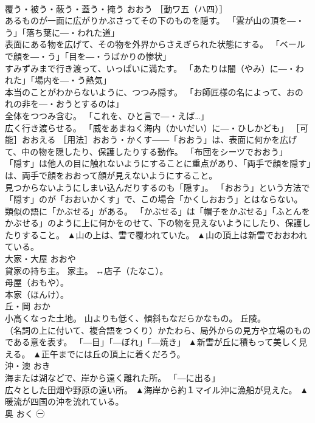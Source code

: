 \documentclass[8pt]{extreport}
\begin{document}
\begin{CJK}{UTF8}{min}
\\	覆う・被う・蔽う・蓋う・掩う	おおう	［動ワ五（ハ四）］ 
\\	あるものが一面に広がりかぶさってその下のものを隠す。 「雲が山の頂を―・う」「落ち葉に―・われた道」 
\\	表面にある物を広げて、その物を外界からさえぎられた状態にする。 「ベールで顔を―・う」「目を―・うばかりの惨状」 
\\	すみずみまで行き渡って、いっぱいに満たす。 「あたりは闇（やみ）に―・われた」「場内を―・う熱気」 
\\	本当のことがわからないように、つつみ隠す。 「お師匠様の名によって、おのれの非を―・おうとするのは」 
\\	全体をつつみ含む。 「これを、ひと言で―・えば…」 
\\	広く行き渡らせる。 「威をあまねく海内（かいだい）に―・ひしかども」 ［可能］おおえる ［用法］おおう・かくす――「おおう」は、表面に何かを広げて、中の物を隠したり、保護したりする動作。 「布団をシーツでおおう」
\\	「隠す」は他人の目に触れないようにすることに重点があり、「両手で顔を隠す」は、両手で顔をおおって顔が見えないようにすること。 
\\	見つからないようにしまい込んだりするのも「隠す」。 「おおう」という方法で「隠す」のが「おおいかくす」で、この場合「かくしおおう」とはならない。 
\\	類似の語に「かぶせる」がある。 「かぶせる」は「帽子をかぶせる」「ふとんをかぶせる」のように上に何かをのせて、下の物を見えないようにしたり、保護したりすること。	▲山の上は、雪で覆われていた。 ▲山の頂上は新雪でおおわれている。
\\	大家・大屋	おおや	
\\	貸家の持ち主。 家主。 ↔店子（たなこ）。 
\\	母屋（おもや）。 
\\	本家（ほんけ）。	
\\	丘・岡	おか	
\\	小高くなった土地。 山よりも低く、傾斜もなだらかなもの。 丘陵。 
\\	（名詞の上に付いて、複合語をつくり）かたわら、局外からの見方や立場のものである意を表す。 「―目」「―ぼれ」「―焼き」	▲新雪が丘に積もって美しく見える。 ▲正午までには丘の頂上に着くだろう。
\\	沖・澳	おき	
\\	海または湖などで、岸から遠く離れた所。 「―に出る」 
\\	広々とした田畑や野原の遠い所。	▲海岸から約１マイル沖に漁船が見えた。 ▲暖流が四国の沖を流れている。
\\	奥	おく	㊀ 

\end{CJK}
\end{document}
